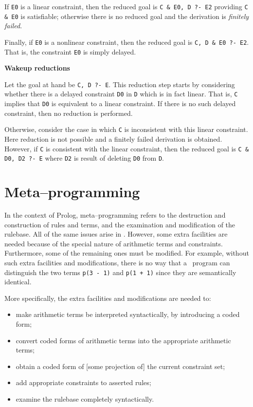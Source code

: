 If {\tt E0} is a linear constraint, then the reduced goal
is {\tt C \& E0, D ?- E2} providing {\tt C \& E0} is satisfiable;
otherwise there is no reduced goal and the derivation is 
{\em finitely failed}.

Finally, if {\tt E0} is a nonlinear constraint, then the reduced
goal is {\tt C, D \& E0 ?- E2}.  That is, the constraint {\tt E0} is simply
delayed.

\noindent
{\bf Wakeup reductions}

Let the goal at hand be {\tt C, D ?- E}.  This reduction step starts by
considering whether there is a delayed constraint {\tt D0} in {\tt D}
which is in fact linear. That is, {\tt C} implies that {\tt D0}
is equivalent to a linear constraint.  If there is no such delayed
constraint, then no reduction is performed.

Otherwise, consider the case in which {\tt C} is inconsistent 
with this linear constraint.  Here reduction is not possible and
a finitely failed derivation is obtained.  However, if {\tt C} is consistent 
with the linear constraint, then the reduced goal is 
{\tt C \& D0, D2 ?- E} where {\tt D2} is result of deleting
{\tt D0} from {\tt D}.

\section{Meta--programming}
\label{meta-section}

In the context of Prolog, meta--programming refers to the destruction and
construction of rules and terms, and the examination and modification of the
rulebase. All of the same issues arise in \CLPR. However,
some extra facilities are needed because of the special nature
of arithmetic terms and constraints.
Furthermore, some of the remaining ones must be modified. 
For example, without such extra facilities and modifications,
there is no way that a \CLPR\ program can distinguish the two terms 
{\tt p(3 - 1)} and {\tt p(1 + 1)} since they are semantically identical. 

More specifically, the extra facilities and modifications are needed to:
\begin{itemize}
\item 
	make arithmetic terms be interpreted syntactically, by introducing a
	coded form;
\item 
	convert coded forms of arithmetic terms into the 
	appropriate arithmetic terms;
\item 
	obtain a coded form of [some projection of] the current constraint set; 
\item 
	add appropriate constraints to asserted rules;
\item 
	examine the rulebase completely syntactically.
\end{itemize}

